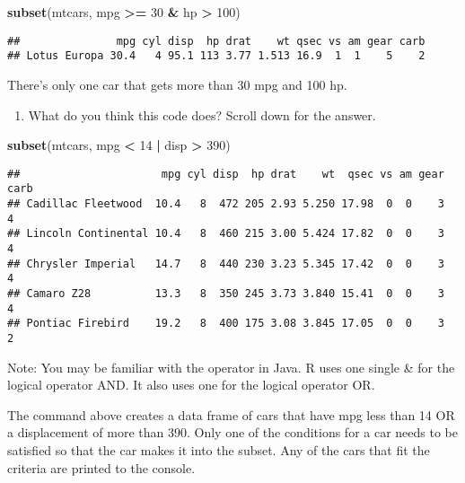 \documentclass[]{article}
\newenvironment{Shaded}{\begin{snugshade}}{\end{snugshade}}
\newcommand{\KeywordTok}[1]{\textcolor[rgb]{0.13,0.29,0.53}{\textbf{#1}}}
\newcommand{\DecValTok}[1]{\textcolor[rgb]{0.00,0.00,0.81}{#1}}
\newcommand{\StringTok}[1]{\textcolor[rgb]{0.31,0.60,0.02}{#1}}
\newcommand{\OperatorTok}[1]{\textcolor[rgb]{0.81,0.36,0.00}{\textbf{#1}}}
\newcommand{\NormalTok}[1]{#1}
\providecommand{\tightlist}{%
  \setlength{\itemsep}{0pt}\setlength{\parskip}{0pt}}
\begin{document}
\begin{Shaded}
\begin{Highlighting}[]
\KeywordTok{subset}\NormalTok{(mtcars, mpg }\OperatorTok{>=}\StringTok{ }\DecValTok{30} \OperatorTok{&}\StringTok{ }\NormalTok{hp }\OperatorTok{>}\StringTok{ }\DecValTok{100}\NormalTok{)}
\end{Highlighting}
\end{Shaded}

\begin{verbatim}
##               mpg cyl disp  hp drat    wt qsec vs am gear carb
## Lotus Europa 30.4   4 95.1 113 3.77 1.513 16.9  1  1    5    2
\end{verbatim}

There's only one car that gets more than 30 mpg and 100 hp.

\begin{enumerate}
\def\labelenumi{\arabic{enumi}.}
\setcounter{enumi}{4}
\tightlist
\item
  What do you think this code does? Scroll down for the answer.
\end{enumerate}

\begin{Shaded}
\begin{Highlighting}[]
\KeywordTok{subset}\NormalTok{(mtcars, mpg }\OperatorTok{<}\StringTok{ }\DecValTok{14} \OperatorTok{|}\StringTok{ }\NormalTok{disp }\OperatorTok{>}\StringTok{ }\DecValTok{390}\NormalTok{)}
\end{Highlighting}
\end{Shaded}

\begin{verbatim}
##                      mpg cyl disp  hp drat    wt  qsec vs am gear carb
## Cadillac Fleetwood  10.4   8  472 205 2.93 5.250 17.98  0  0    3    4
## Lincoln Continental 10.4   8  460 215 3.00 5.424 17.82  0  0    3    4
## Chrysler Imperial   14.7   8  440 230 3.23 5.345 17.42  0  0    3    4
## Camaro Z28          13.3   8  350 245 3.73 3.840 15.41  0  0    3    4
## Pontiac Firebird    19.2   8  400 175 3.08 3.845 17.05  0  0    3    2
\end{verbatim}

Note: You may be familiar with the \textbar{}\textbar{} operator in
Java. R uses one single \& for the logical operator AND. It also uses
one \textbar{} for the logical operator OR.

The command above creates a data frame of cars that have mpg less than
14 OR a displacement of more than 390. Only one of the conditions for a
car needs to be satisfied so that the car makes it into the subset. Any
of the cars that fit the criteria are printed to the console.
\end{document}
